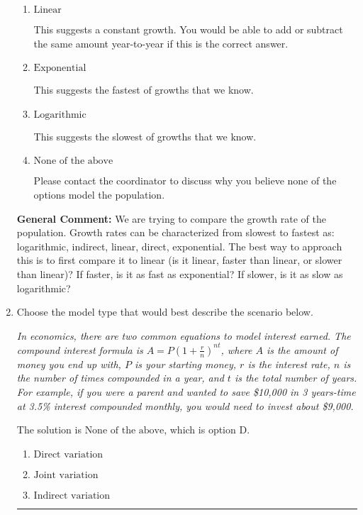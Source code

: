 \documentclass{extbook}[14pt]
\newcommand{\litem}[1]{\item #1

\rule{\textwidth}{0.4pt}}
\begin{document}
\begin{enumerate}
{\begin{enumerate}[label=\Alph*.]
This suggests a growth faster than constant but slower than exponential.
\item \( \text{Linear} \)

This suggests a constant growth. You would be able to add or subtract the same amount year-to-year if this is the correct answer.
\item \( \text{Exponential} \)

This suggests the fastest of growths that we know.
\item \( \text{Logarithmic} \)

This suggests the slowest of growths that we know.
\item \( \text{None of the above} \)

Please contact the coordinator to discuss why you believe none of the options model the population.
\end{enumerate}

\textbf{General Comment:} We are trying to compare the growth rate of the population. Growth rates can be characterized from slowest to fastest as: logarithmic, indirect, linear, direct, exponential. The best way to approach this is to first compare it to linear (is it linear, faster than linear, or slower than linear)? If faster, is it as fast as exponential? If slower, is it as slow as logarithmic?
}
\litem{
Choose the model type that would best describe the scenario below.

\begin{center}
    \textit{ In economics, there are two common equations to model interest earned. The compound interest formula is $A = P (1 + \frac{r}{n})^{nt}$, where $A$ is the amount of money you end up with, $P$ is your starting money, $r$ is the interest rate, $n$ is the number of times compounded in a year, and $t$ is the total number of years. For example, if you were a parent and wanted to save \$10,000 in 3 years-time at 3.5\% interest compounded monthly, you would need to invest about \$9,000. }
\end{center}


The solution is \( \text{None of the above} \), which is option D.\begin{enumerate}[label=\Alph*.]
\item \( \text{Direct variation} \)


\item \( \text{Joint variation} \)


\item \( \text{Indirect variation} \)



\end{enumerate}}
\end{enumerate}
\end{document}
